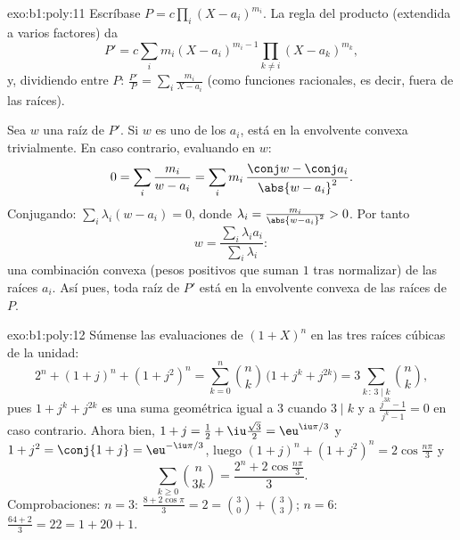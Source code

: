 \begin{solution}{exo:b1:poly:11}
Escríbase $P = c\prod_i (X - a_i)^{m_i}$. La regla del producto
(extendida a varios factores) da
\[
P' = c\sum_{i} m_i (X - a_i)^{m_i - 1} \prod_{k \neq i} (X -
a_k)^{m_k},
\]
y, dividiendo entre $P$: $\frac{P'}{P} = \sum_i \frac{m_i}{X - a_i}$
(como funciones racionales, es decir, fuera de las raíces).

Sea $w$ una raíz de $P'$. Si $w$ es uno de los $a_i$, está en la
envolvente convexa trivialmente. En caso contrario, evaluando en $w$:
\[
0 = \sum_i \frac{m_i}{w - a_i}
= \sum_i m_i\, \frac{\conj w - \conj a_i}{\abs{w - a_i}^2} .
\]
Conjugando: $\sum_i \lambda_i (w - a_i) = 0$, donde
$\lambda_i = \frac{m_i}{\abs{w - a_i}^2} > 0$. Por tanto
\[
w = \frac{\sum_i \lambda_i a_i}{\sum_i \lambda_i} :
\]
una combinación convexa (pesos positivos que suman $1$ tras
normalizar) de las raíces $a_i$. Así pues, toda raíz de $P'$ está en la
envolvente convexa de las raíces de $P$.
\end{solution}

\begin{solution}{exo:b1:poly:12}
Súmense las evaluaciones de $(1 + X)^n$ en las tres raíces cúbicas de
la unidad:
\[
2^n + (1 + j)^n + (1 + j^2)^n
= \sum_{k=0}^n \binom nk\,\bigl(1 + j^k + j^{2k}\bigr)
= 3\sum_{k\,:\,3\mid k}\binom nk ,
\]
pues $1 + j^k + j^{2k}$ es una suma geométrica igual a $3$ cuando
$3 \mid k$ y a $\frac{j^{3k} - 1}{j^k - 1} = 0$ en caso contrario.
Ahora bien, $1 + j = \frac12 + \iu\frac{\sqrt3}2 = \eu^{\iu\pi/3}$ y
$1 + j^2 = \conj{1 + j} = \eu^{-\iu\pi/3}$, luego
$(1+j)^n + (1+j^2)^n = 2\cos\frac{n\pi}3$ y
\[
\sum_{k\geq0}\binom n{3k} = \frac{2^n + 2\cos\frac{n\pi}3}{3} .
\]
Comprobaciones: $n = 3$: $\frac{8 + 2\cos\pi}3 = 2 = \binom30 +
\binom33$; $n = 6$: $\frac{64 + 2}3 = 22 = 1 + 20 + 1$.
\end{solution}

